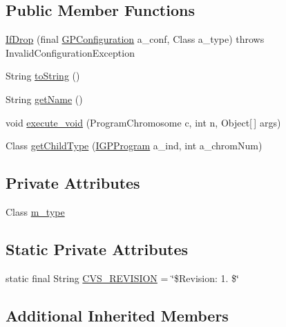 \subsection*{Public Member Functions}
\begin{DoxyCompactItemize}
\item 
\hyperlink{classexamples_1_1gp_1_1painted_desert_1_1_if_drop_af1380f9fa9521389b488e8f40b1c09a1}{If\-Drop} (final \hyperlink{classorg_1_1jgap_1_1gp_1_1impl_1_1_g_p_configuration}{G\-P\-Configuration} a\-\_\-conf, Class a\-\_\-type)  throws Invalid\-Configuration\-Exception 
\item 
String \hyperlink{classexamples_1_1gp_1_1painted_desert_1_1_if_drop_abb3748946e1f52239995c0c544bed53d}{to\-String} ()
\item 
String \hyperlink{classexamples_1_1gp_1_1painted_desert_1_1_if_drop_a5da61d0f9c77f2e50ca6c466858b8b71}{get\-Name} ()
\item 
void \hyperlink{classexamples_1_1gp_1_1painted_desert_1_1_if_drop_a856ddfa71ef0a36e0430bacb389e1272}{execute\-\_\-void} (Program\-Chromosome c, int n, Object\mbox{[}$\,$\mbox{]} args)
\item 
Class \hyperlink{classexamples_1_1gp_1_1painted_desert_1_1_if_drop_ac1f7c0000b5f09fb6b298d2c6a17ad4a}{get\-Child\-Type} (\hyperlink{interfaceorg_1_1jgap_1_1gp_1_1_i_g_p_program}{I\-G\-P\-Program} a\-\_\-ind, int a\-\_\-chrom\-Num)
\end{DoxyCompactItemize}
\subsection*{Private Attributes}
\begin{DoxyCompactItemize}
\item 
Class \hyperlink{classexamples_1_1gp_1_1painted_desert_1_1_if_drop_aeb469a220d59f694f192033cbfb41f74}{m\-\_\-type}
\end{DoxyCompactItemize}
\subsection*{Static Private Attributes}
\begin{DoxyCompactItemize}
\item 
static final String \hyperlink{classexamples_1_1gp_1_1painted_desert_1_1_if_drop_a741c878020c491cd7e690792fdd85f29}{C\-V\-S\-\_\-\-R\-E\-V\-I\-S\-I\-O\-N} = \char`\"{}\$Revision\-: 1. \$\char`\"{}
\end{DoxyCompactItemize}
\subsection*{Additional Inherited Members}


